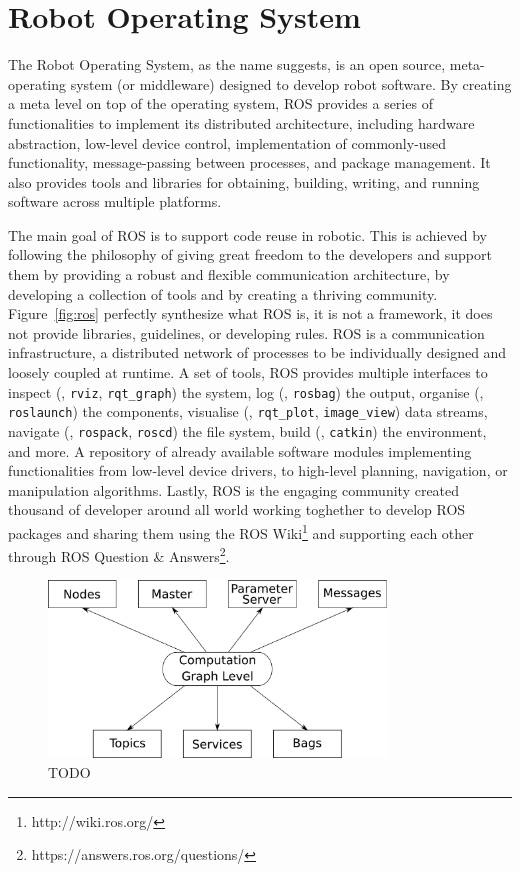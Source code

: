 \section{Robot Operating System}
\label{sec:ros}
The Robot Operating System, as the name suggests, is an open source, meta-operating system (or middleware) designed to develop robot software. By creating a meta level on top of the operating system, ROS provides a series of functionalities to implement its distributed architecture, including  hardware abstraction, low-level device control, implementation of commonly-used functionality, message-passing between processes, and package management. It also provides tools and libraries for obtaining, building, writing, and running software across multiple platforms.

The main goal of ROS is to support code reuse in robotic. This is achieved by following the philosophy of giving great freedom to the developers and support them by providing a robust and flexible communication architecture, by developing a collection of tools and by creating a thriving community. Figure~\ref{fig:ros} perfectly synthesize what ROS is, it is not a framework, it does not provide libraries, guidelines, or developing rules. ROS is a communication infrastructure, a distributed network of processes to be individually designed and loosely coupled at runtime. A set of tools, ROS provides multiple interfaces to inspect (\eg, \texttt{rviz}, \texttt{rqt\_graph}) the system, log (\eg, \texttt{rosbag}) the output, organise (\eg, \texttt{roslaunch}) the components, visualise (\eg, \texttt{rqt\_plot}, \texttt{image\_view}) data streams, navigate (\eg, \texttt{rospack}, \texttt{roscd}) the file system, build (\eg, \texttt{catkin}) the environment, and more. A repository of already available software modules implementing functionalities from low-level device drivers, to high-level planning, navigation, or manipulation algorithms. Lastly, ROS is the engaging community created thousand of developer around all world working toghether to develop ROS packages and sharing them using the ROS Wiki\footnote{http://wiki.ros.org/} and supporting each other through ROS Question \& Answers\footnote{https://answers.ros.org/questions/}.

\begin{figure}[t]
    \centering
    \includegraphics[width=0.8\textwidth]{gfx/ros/graph}
    \caption{TODO}\label{fig:ros-graph}
\end{figure}

